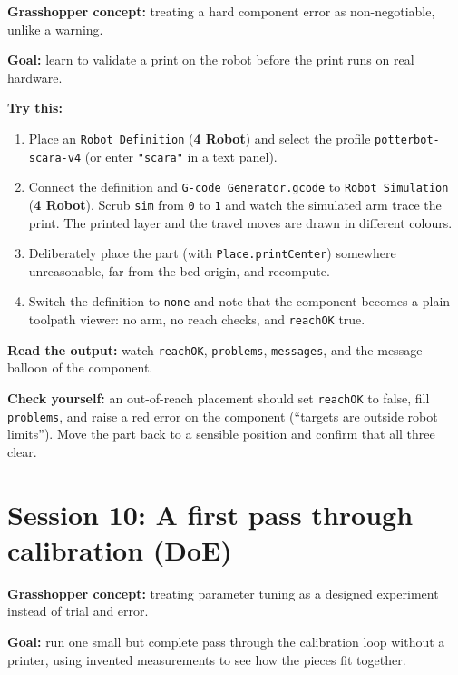 \documentclass[11pt]{article}
\newcommand{\param}[1]{\texttt{#1}}
\newcommand{\exlabel}[1]{\par\vspace{0.3em}\noindent\textbf{#1:}\enspace}
\begin{document}
\exlabel{Grasshopper concept} treating a hard component error as
non-negotiable, unlike a warning.

\exlabel{Goal} learn to validate a print on the robot before the print
runs on real hardware.

\exlabel{Try this}
\begin{enumerate}
  \item Place an \param{Robot Definition} (\textbf{4 Robot}) and select the profile \param{potterbot-scara-v4} (or enter \texttt{"scara"} in a text panel).
  \item Connect the definition and \param{G-code Generator.gcode} to \param{Robot Simulation} (\textbf{4 Robot}). Scrub \param{sim} from \param{0} to \param{1} and watch the simulated arm trace the print. The printed layer and the travel moves are drawn in different colours.
  \item Deliberately place the part (with \param{Place.printCenter}) somewhere unreasonable, far from the bed origin, and recompute.
  \item Switch the definition to \param{none} and note that the component becomes a plain toolpath viewer: no arm, no reach checks, and \param{reachOK} true.
\end{enumerate}

\exlabel{Read the output} watch \param{reachOK}, \param{problems},
\param{messages}, and the message balloon of the component.

\exlabel{Check yourself} an out-of-reach placement should set
\param{reachOK} to false, fill \param{problems}, and raise a red error
on the component (``targets are outside robot limits''). Move the part
back to a sensible position and confirm that all three clear.

\section{Session 10: A first pass through calibration (DoE)}

\exlabel{Grasshopper concept} treating parameter tuning as a designed
experiment instead of trial and error.

\exlabel{Goal} run one small but complete pass through the calibration
loop without a printer, using invented measurements to see how the
pieces fit together.
\end{document}

